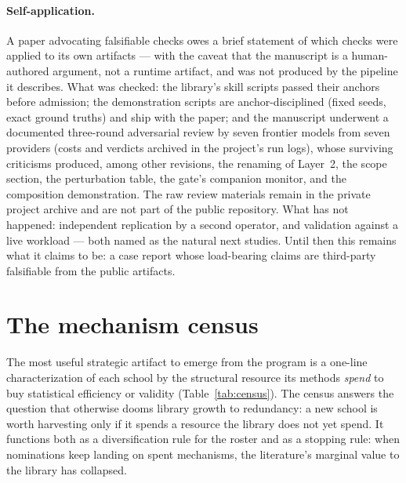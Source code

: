 \documentclass[11pt,a4paper]{article}
\begin{document}
\paragraph{Self-application.} A paper advocating falsifiable checks owes a
brief statement of which checks were applied to its own artifacts --- with
the caveat that the manuscript is a human-authored argument, not a runtime
artifact, and was not produced by the pipeline it describes. What was
checked: the library's skill scripts passed their anchors before
admission; the demonstration scripts are anchor-disciplined (fixed seeds,
exact ground truths) and ship with the paper; and the manuscript underwent
a documented three-round adversarial review by seven frontier models from
seven providers (costs and verdicts archived in the project's run logs),
whose surviving criticisms produced, among other revisions, the renaming
of Layer~2, the scope section, the perturbation table, the gate's
companion monitor, and the composition demonstration. The raw review
materials remain in the private project archive and are not part of the
public repository. What has not
happened: independent replication by a second operator, and validation
against a live workload --- both named as the natural next studies. Until
then this remains what it claims to be: a case report whose load-bearing
claims are third-party falsifiable from the public artifacts.

\section{The mechanism census}\label{sec:census}

The most useful strategic artifact to emerge from the program is a one-line
characterization of each school by the structural resource its methods
\emph{spend} to buy statistical efficiency or validity
(Table~\ref{tab:census}). The census answers the question that otherwise
dooms library growth to redundancy: a new school is worth harvesting only
if it spends a resource the library does not yet spend. It functions both
as a diversification rule for the roster and as a stopping rule: when
nominations keep landing on spent mechanisms, the literature's marginal
value to the library has collapsed.
\end{document}
